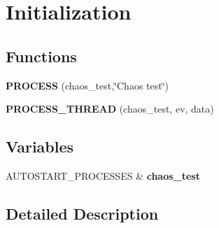 \hypertarget{group__chaos-test-init}{\section{Initialization}
\label{group__chaos-test-init}
}
\subsection*{Functions}
\begin{DoxyCompactItemize}
\item 
\hypertarget{group__chaos-test-init_ga7aa51b1c2d7f74c96323298782db6694}{{\bfseries P\-R\-O\-C\-E\-S\-S} (chaos\-\_\-test,\char`\"{}Chaos test\char`\"{})}\label{group__chaos-test-init_ga7aa51b1c2d7f74c96323298782db6694}

\item 
\hypertarget{group__chaos-test-init_gabb7d071980914c32831b28eb10dbb042}{{\bfseries P\-R\-O\-C\-E\-S\-S\-\_\-\-T\-H\-R\-E\-A\-D} (chaos\-\_\-test, ev, data)}\label{group__chaos-test-init_gabb7d071980914c32831b28eb10dbb042}

\end{DoxyCompactItemize}
\subsection*{Variables}
\begin{DoxyCompactItemize}
\item 
\hypertarget{group__chaos-test-init_ga303eedf8ef9ff46e60b1d092b069b705}{A\-U\-T\-O\-S\-T\-A\-R\-T\-\_\-\-P\-R\-O\-C\-E\-S\-S\-E\-S \& {\bfseries chaos\-\_\-test}}\label{group__chaos-test-init_ga303eedf8ef9ff46e60b1d092b069b705}

\end{DoxyCompactItemize}


\subsection{Detailed Description}
